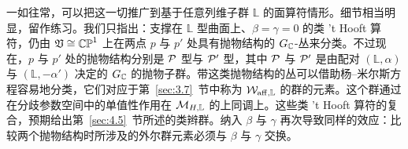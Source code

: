 \bigskip{}

一如往常，可以把这一切推广到基于任意列维子群 $\mathbb{L}$ 的面算符情形。细节相当明显，留作练习。我们只指出：支撑在 $\mathbb{L}$ 型曲面上、$\beta=\gamma=0$ 的类 't Hooft 算符，仍由 $\mathfrak{V}\cong \mathbb{CP}^1$ 上在两点 $p$ 与 $p'$ 处具有抛物结构的 $G_{\mathbb{C}}$-丛来分类。不过现在，$p$ 与 $p'$ 处的抛物结构分别是 $\mathcal{P}$ 型与 $\mathcal{P}'$ 型，其中 $\mathcal{P}$ 与 $\mathcal{P}'$ 是由配对 $(\mathbb{L},\alpha)$ 与 $(\mathbb{L},-\alpha')$ 决定的 $G_{\mathbb{C}}$ 的抛物子群。带这类抛物结构的丛可以借助杨–米尔斯方程容易地分类，它们对应于第~\ref{sec:3.7}~节中称为 ${\mathcal W}_{{\rm aff},\mathbb{L}}$ 的群的元素。这个群通过在分歧参数空间中的单值性作用在 ${\mathcal{M}}_{H,\mathbb{L}}$ 的上同调上。这些类 't Hooft 算符的复合，预期给出第~\ref{sec:4.5}~节所述的类辫群。纳入 $\beta$ 与 $\gamma$ 再次导致同样的效应：比较两个抛物结构时所涉及的外尔群元素必须与 $\beta$ 与 $\gamma$ 交换。
